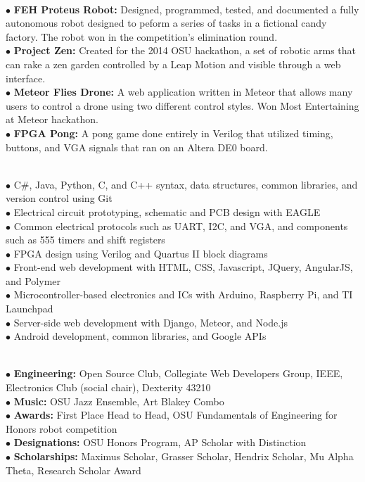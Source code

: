 \documentclass[10pt]{article}
\begin{document}
\\
$\bullet$ {\bf FEH Proteus Robot:} Designed, programmed, tested, and documented a fully autonomous robot designed to peform a series of tasks in a fictional candy factory. The robot won in the competition's elimination round.\\
$\bullet$ {\bf Project Zen:} Created for the 2014 OSU hackathon, a set of robotic arms that can rake a zen garden controlled by a Leap Motion and visible through a web interface.\\
$\bullet$ {\bf Meteor Flies Drone:} A web application written in Meteor that allows many users to control a drone using two different control styles. Won Most Entertaining at Meteor hackathon.\\
$\bullet$ {\bf FPGA Pong:} A pong game done entirely in Verilog that utilized timing, buttons, and VGA signals that ran on an Altera DE0 board.
\medskip

\\
$\bullet$ C\#, Java, Python, C, and C++ syntax, data structures, common libraries, and version control using Git\\
$\bullet$ Electrical circuit prototyping, schematic and PCB design with EAGLE\\
$\bullet$ Common electrical protocols such as UART, I2C, and VGA, and components such as 555 timers and shift registers\\
$\bullet$ FPGA design using Verilog and Quartus II block diagrams\\
$\bullet$ Front-end web development with HTML, CSS, Javascript, JQuery, AngularJS, and Polymer\\
$\bullet$ Microcontroller-based electronics and ICs with Arduino, Raspberry Pi, and TI Launchpad\\
$\bullet$ Server-side web development with Django, Meteor, and Node.js\\
$\bullet$ Android development, common libraries, and Google APIs
\medskip

\\
$\bullet$ {\bf Engineering:} Open Source Club, Collegiate Web Developers Group, IEEE, Electronics Club (social chair), Dexterity 43210\\
$\bullet$ {\bf Music:} OSU Jazz Ensemble, Art Blakey Combo\\
$\bullet$ {\bf Awards:} First Place Head to Head, OSU Fundamentals of Engineering for Honors robot competition\\
$\bullet$ {\bf Designations:} OSU Honors Program, AP Scholar with Distinction\\
$\bullet$ {\bf Scholarships:} Maximus Scholar, Grasser Scholar, Hendrix Scholar, Mu Alpha Theta, Research Scholar Award
\medskip
\end{document}
